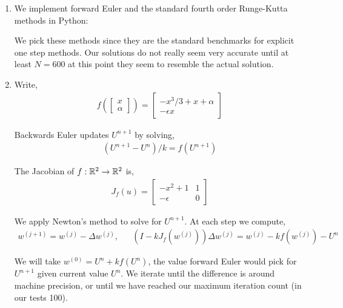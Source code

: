 \documentclass[10pt]{article}
\begin{document}
\begin{solution}[Solution]

\begin{enumerate}[label=(\alph*)]
    \item
        We implement forward Euler and the standard fourth order Runge-Kutta methods in Python:
        
        

        We pick these methods since they are the standard benchmarks for explicit one step methods. Our solutions do not really seem very accurate until at least \( N=600 \) at this point they seem to resemble the actual solution.

    \item
        Write,
        \begin{align*}
            f\left(\left[\begin{array}{c}x\\ \alpha\end{array}\right]\right) = \left[\begin{array}{c} -x^3/3 + x + \alpha \\ -\epsilon x \end{array}\right]
        \end{align*}

        Backwards Euler updates \( U^{n+1} \) by solving,
        \begin{align*}
            ( U^{n+1} - U^n )/k = f(U^{n+1})
        \end{align*}



        The Jacobian of \( f:\mathbb{R}^2 \to \mathbb{R}^2 \) is,
        \begin{align*}
            J_f(u)
              = \left[\begin{array}{cc}
                -x^2 + 1 & 1 \\
                -\epsilon & 0
            \end{array}\right]
        \end{align*}

        We apply Newton's method to solve for \( U^{n+1} \). At each step we compute,
        \begin{align*}
            w^{(j+1)} = w^{(j)} - \Delta w^{(j)}, && (I-kJ_f(w^{(j)})) \Delta w^{(j)} = w^{(j)} -k f(w^{(j)}) - U^{n}
        \end{align*}

        We will take \( w^{(0)} = U^n + k f(U^n) \), the value forward Euler would pick for \( U^{n+1} \) given current value \( U^{n} \). We iterate until the difference is around machine precision, or until we have reached our maximum iteration count (in our tests 100).


\end{enumerate}
\end{solution}
\end{document}
